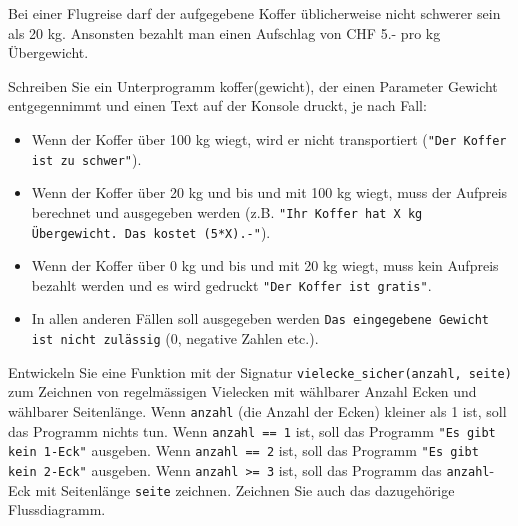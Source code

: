 \begin{myexercise}
	Bei einer Flugreise darf der aufgegebene Koffer üblicherweise nicht schwerer sein als 20 kg. Ansonsten bezahlt man einen Aufschlag von CHF 5.- pro kg Übergewicht.

	Schreiben Sie ein Unterprogramm koffer(gewicht), der einen Parameter Gewicht entgegennimmt und einen Text auf der Konsole druckt, je nach Fall:

	\begin{itemize}
		\item Wenn der Koffer über 100 kg wiegt, wird er nicht transportiert (\lstinline|"Der Koffer ist zu schwer"|).
		\item Wenn der Koffer über 20 kg und bis und mit 100 kg wiegt, muss der Aufpreis berechnet und ausgegeben werden (z.B. \lstinline|"Ihr Koffer hat X kg Übergewicht. Das kostet (5*X).-"|).
		\item Wenn der Koffer über 0 kg und bis und mit 20 kg wiegt, muss kein Aufpreis bezahlt werden und es wird gedruckt \lstinline|"Der Koffer ist gratis"|.
		\item  In allen anderen Fällen soll ausgegeben werden \lstinline|Das eingegebene Gewicht ist nicht zulässig| (0, negative Zahlen etc.).
	\end{itemize}
	\begin{myanswer}
		
	\end{myanswer}
\end{myexercise}

\begin{myexercise}
	Entwickeln Sie eine Funktion mit der Signatur \lstinline|vielecke_sicher(anzahl, seite)| zum Zeichnen von regelmässigen Vielecken mit wählbarer Anzahl Ecken und wählbarer Seitenlänge. Wenn \lstinline|anzahl| (die Anzahl der Ecken) kleiner als 1 ist, soll das Programm nichts tun. Wenn \lstinline|anzahl == 1| ist, soll das Programm
	\lstinline|"Es gibt kein 1-Eck"| ausgeben. Wenn \lstinline|anzahl == 2| ist, soll das Programm
	\lstinline|"Es gibt kein 2-Eck"| ausgeben. Wenn \lstinline|anzahl >= 3| ist, soll das Programm das \lstinline|anzahl|-Eck mit Seitenlänge \lstinline|seite| zeichnen. Zeichnen Sie auch das dazugehörige Flussdiagramm.
	\begin{myanswer}
		
	\end{myanswer}
\end{myexercise}

